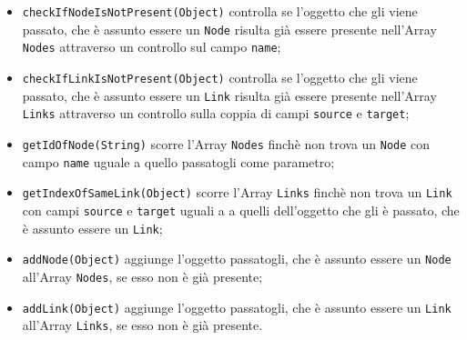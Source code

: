 	\begin{itemize}
		\item{\texttt{checkIfNodeIsNotPresent(Object)} controlla se l'oggetto che gli viene passato, che è assunto essere un \texttt{Node} risulta già essere presente nell'Array \texttt{Nodes} attraverso un controllo sul campo \texttt{name}; }
		\item{\texttt{checkIfLinkIsNotPresent(Object)} controlla se l'oggetto che gli viene passato, che è assunto essere un \texttt{Link} risulta già essere presente nell'Array \texttt{Links} attraverso un controllo sulla coppia di campi \texttt{source} e \texttt{target}; }
		\item{\texttt{getIdOfNode(String)} scorre l'Array \texttt{Nodes} finchè non trova un \texttt{Node} con campo \texttt{name} uguale a quello passatogli come parametro; }
		\item{\texttt{getIndexOfSameLink(Object)} scorre l'Array \texttt{Links} finchè non trova un \texttt{Link} con campi \texttt{source} e \texttt{target} uguali a a quelli dell'oggetto che gli è passato, che è assunto essere un \texttt{Link};}
		\item{\texttt{addNode(Object)} aggiunge l'oggetto passatogli, che è assunto essere un \texttt{Node} all'Array \texttt{Nodes}, se esso non è già presente;}
		\item{\texttt{addLink(Object)} aggiunge l'oggetto passatogli, che è assunto essere un \texttt{Link} all'Array \texttt{Links}, se esso non è già presente.}					
	\end{itemize}

